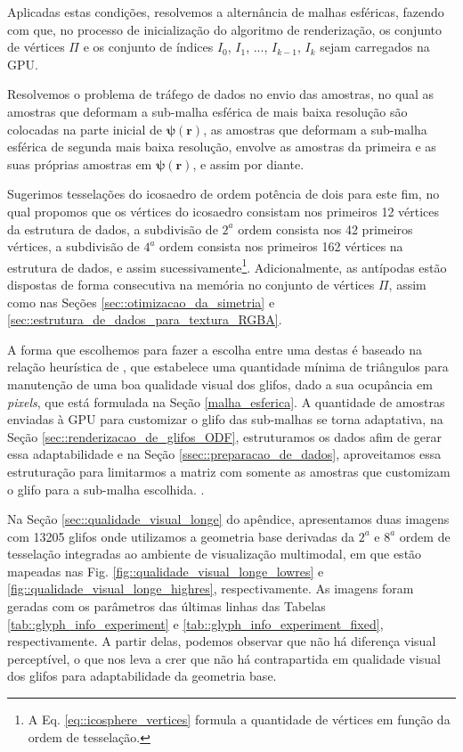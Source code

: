 \documentclass[
    12pt,                %
    oneside,            %
    a4paper,            %
    english,            %
    french,                %
    spanish,            %
    brazil                %
    ]{abntex2}
\begin{document}
Aplicadas estas condições, resolvemos a alternância de malhas esféricas, fazendo com que, no processo de inicialização do algoritmo de renderização, os conjunto de vértices $\Pi$ e os conjunto de índices $I_0$, $I_1$, ..., $I_{k-1}$, $I_k$ sejam carregados na GPU.

Resolvemos o problema de tráfego de dados no envio das amostras, no qual as amostras que deformam a sub-malha esférica de mais baixa resolução são colocadas na parte inicial de $\boldsymbol{\psi(\mathbf{r})}$, as amostras que deformam a sub-malha esférica de segunda mais baixa resolução, envolve as amostras da primeira e as suas próprias amostras em $\boldsymbol{\psi(\mathbf{r})}$, e assim por diante.

Sugerimos tesselações do icosaedro de ordem potência de dois para este fim, no qual propomos que os vértices do icosaedro consistam nos primeiros 12 vértices da estrutura de dados, a subdivisão de $2^a$ ordem consista nos 42 primeiros vértices, a subdivisão de $4^a$ ordem consista nos primeiros 162 vértices na estrutura de dados, e assim sucessivamente\footnote{A Eq. \ref{eq::icosphere_vertices} formula a quantidade de vértices em função da ordem de tesselação.}. Adicionalmente, as antípodas estão dispostas de forma consecutiva na memória no conjunto de vértices $\Pi$, assim como nas Seções \ref{sec::otimizacao_da_simetria} e \ref{sec::estrutura_de_dados_para_textura_RGBA}.

A forma que escolhemos para fazer a escolha entre uma destas é baseado na relação heurística de , que estabelece uma quantidade mínima de triângulos para manutenção de uma boa qualidade visual dos glifos, dado a sua ocupância em \textit{pixels}, que está formulada na Seção %
\ref{malha_esferica}. A quantidade de amostras enviadas à GPU para customizar o glifo das sub-malhas se torna adaptativa, na Seção \ref{sec::renderizacao_de_glifos_ODF}, estruturamos os dados afim de gerar essa adaptabilidade e na Seção \ref{ssec::preparacao_de_dados}, aproveitamos essa estruturação para limitarmos a matriz com somente as amostras que customizam o glifo para a sub-malha escolhida.
.

Na Seção \ref{sec::qualidade_visual_longe} do apêndice, apresentamos duas imagens com 13205 glifos onde utilizamos a geometria base derivadas da $2^a$ e $8^a$ ordem de tesselação integradas ao ambiente de visualização multimodal, em que estão mapeadas nas Fig. \ref{fig::qualidade_visual_longe_lowres} e \ref{fig::qualidade_visual_longe_highres}, respectivamente. As imagens foram geradas com os parâmetros das últimas linhas das Tabelas \ref{tab::glyph_info_experiment} e \ref{tab::glyph_info_experiment_fixed}, respectivamente. A partir delas, podemos observar que não há diferença visual perceptível, o que nos leva a crer que não há contrapartida em qualidade visual dos glifos para adaptabilidade da geometria base.
\end{document}
